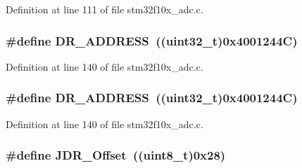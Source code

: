 Definition at line 111 of file stm32f10x\+\_\+adc.\+c.

\subsubsection[{\texorpdfstring{D\+R\+\_\+\+A\+D\+D\+R\+E\+SS}{DR_ADDRESS}}]{\setlength{\rightskip}{0pt plus 5cm}\#define D\+R\+\_\+\+A\+D\+D\+R\+E\+SS~(({\bf uint32\+\_\+t})0x4001244\+C)}\hypertarget{group___a_d_c___private___defines_ga35ecb1c96cfae175f5f00490e5e91e88}{}\label{group___a_d_c___private___defines_ga35ecb1c96cfae175f5f00490e5e91e88}


Definition at line 140 of file stm32f10x\+\_\+adc.\+c.

\subsubsection[{\texorpdfstring{D\+R\+\_\+\+A\+D\+D\+R\+E\+SS}{DR_ADDRESS}}]{\setlength{\rightskip}{0pt plus 5cm}\#define D\+R\+\_\+\+A\+D\+D\+R\+E\+SS~(({\bf uint32\+\_\+t})0x4001244\+C)}\hypertarget{group___a_d_c___private___defines_ga35ecb1c96cfae175f5f00490e5e91e88}{}\label{group___a_d_c___private___defines_ga35ecb1c96cfae175f5f00490e5e91e88}


Definition at line 140 of file stm32f10x\+\_\+adc.\+c.

\subsubsection[{\texorpdfstring{J\+D\+R\+\_\+\+Offset}{JDR_Offset}}]{\setlength{\rightskip}{0pt plus 5cm}\#define J\+D\+R\+\_\+\+Offset~(({\bf uint8\+\_\+t})0x28)}\hypertarget{group___a_d_c___private___defines_ga5671a68d6f0d01c6c465ee7a3a8f3eea}{}\label{group___a_d_c___private___defines_ga5671a68d6f0d01c6c465ee7a3a8f3eea}


